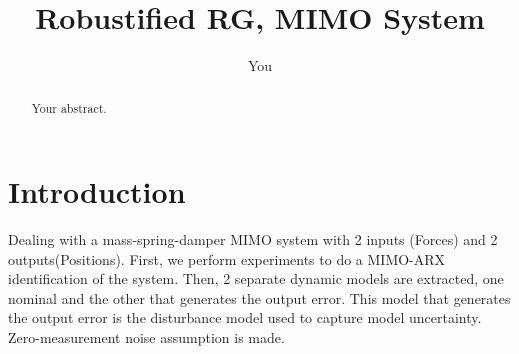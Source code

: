 \documentclass[a4paper]{article}
\title{Robustified RG, MIMO System}
\author{You}
\begin{document}
\maketitle

\begin{abstract}
Your abstract.
\end{abstract}

\section{Introduction}

Dealing with a mass-spring-damper MIMO system with 2 inputs (Forces) and 2 outputs(Positions).
First, we perform experiments to do a MIMO-ARX identification of the system. Then, 2 separate dynamic models are extracted, one nominal and the other that generates the output error. This model that generates the output error is the disturbance model used to capture model uncertainty. Zero-measurement noise assumption is made.
\end{document}
